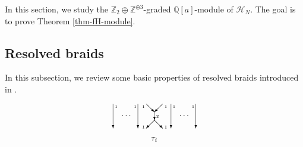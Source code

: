 \documentclass{amsart}
\theoremstyle{plain}
\theoremstyle{definition}
\theoremstyle{remark}
\numberwithin{equation}{section}
\begin{document}
In this section, we study the ${\mathbb{Z}}_2\oplus {\mathbb{Z}}^{\oplus 3}$-graded ${\mathbb{Q}}[a]$-module of ${\mathcal{H}}_N$. The goal is to prove Theorem \ref{thm-fH-module}.

\subsection{Resolved braids} In this subsection, we review some basic properties of resolved braids introduced in \cite{Wu5}.

\begin{figure}[ht]
\[

\setlength{\unitlength}{1pt}
\begin{picture}(100,45)(-50,-15)

\put(-50,30){\vector(0,-1){30}}

\put(-40,15){$\dots$}

\put(-20,30){\vector(0,-1){30}}

\put(-10,30){\vector(1,-1){10}}

\put(10,30){\vector(-1,-1){10}}

\put(0,20){\vector(0,-1){10}}

\put(0,10){\vector(1,-1){10}}

\put(0,10){\vector(-1,-1){10}}

\put(50,30){\vector(0,-1){30}}

\put(30,15){$\dots$}

\put(20,30){\vector(0,-1){30}}

\put(-15,25){\tiny{$1$}}

\put(12,25){\tiny{$1$}}

\put(-15,0){\tiny{$1$}}

\put(12,0){\tiny{$1$}}

\put(2,13){\tiny{$2$}}

\put(-4,-15){$\tau_i$}

\put(-48,25){\tiny{$1$}}

\put(-25,25){\tiny{$1$}}

\put(22,25){\tiny{$1$}}

\put(45,25){\tiny{$1$}}

\end{picture}

\]
\caption{}\label{fig-tau-i}

\end{figure}
\end{document}
